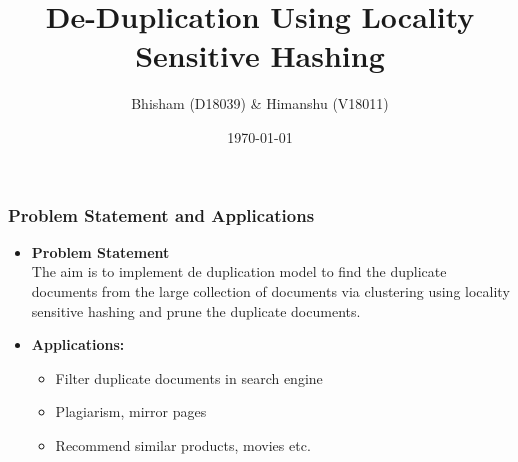 \documentclass[15pt,t]{beamer}
\author{Bhisham (D18039) \& Himanshu (V18011)}
\title{De-Duplication  Using Locality Sensitive Hashing}
\institute{Programming Practicum (CS 571)}
\date{\today}
\begin{document}
	\begin{frame}[plain]
	  \titlepage
	\end{frame}






\begin{frame}
		\frametitle{Problem Statement and Applications}
		\begin{itemize}[topsep=0pt,itemsep=0ex,partopsep=1ex,parsep=1ex]
			\item[$\square$] \textbf{Problem Statement} \\
			The aim is to implement de duplication model to find the duplicate documents from the large collection of documents via clustering using locality sensitive hashing and prune the duplicate documents.

			\item[$\square$] \textbf{Applications:}
				\begin{itemize}[topsep=0pt,itemsep=0ex,partopsep=1ex,parsep=1ex]
					\item [$\square$] Filter duplicate documents in search engine
					\item [$\square$] Plagiarism, mirror pages
					\item [$\square$] Recommend similar products, movies etc.
				\end{itemize}

		\end{itemize}
	\end{frame}
	
\end{document}
